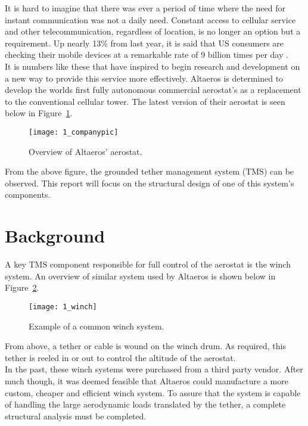 \label{chapt:intro}

It is hard to imagine that there was ever a period of time where the need for instant communication was not a daily need. Constant access to cellular service and other telecommunication, regardless of location, is no longer an option but a requirement. Up nearly 13\% from last year, it is said that US consumers are checking their mobile devices at a remarkable rate of 9 billion times per day \cite{deloittestat}.\\

It is numbers like these that have inspired \Company to begin research and development on a new way to provide this service more effectively. Altaeros is determined to develop the worlds first fully autonomous commercial aerostat's as a replacement to the conventional cellular tower. The latest version of their aerostat is seen below in Figure~\ref{fig:1_companypic}.

\begin{figure}[H]
	\centering
	\texttt{[image: 1\_companypic]}
	\caption[Overview of Altaeros' aerostat.]{Overview of Altaeros' aerostat.\protect\cite{companypicweb}}
	\label{fig:1_companypic}
\end{figure}

From the above figure, the grounded tether management system (TMS) can be observed. This report will focus on the structural design of one of this system's components.

\section{Background} 

A key TMS component responsible for full control of the aerostat is the winch system. An overview of similar system used by Altaeros is shown below in Figure~\ref{fig:1_winch}.
\begin{figure}[H]
	\centering
	\texttt{[image: 1\_winch]}
	\caption[Example of a common winch system.]{Example of a common winch system.\protect\cite{winchpic}}
	\label{fig:1_winch}
\end{figure}

From above, a tether or cable is wound on the winch drum. As required, this tether is reeled in or out to control the altitude of the aerostat.\\

In the past, these winch systems were purchased from a third party vendor. After much though, it was deemed feasible that Altaeros could manufacture a more custom, cheaper and efficient winch system. To assure that the system is capable of handling the large aerodynamic loads translated by the tether, a complete structural analysis must be completed.

